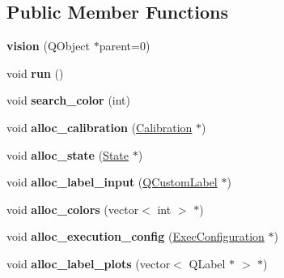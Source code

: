 \subsection*{Public Member Functions}
\begin{DoxyCompactItemize}
\item 
{\bfseries vision} (Q\+Object $\ast$parent=0)\hypertarget{classvision_a81ffb3d1b91453b4516bef1ac130b5c4}{}\label{classvision_a81ffb3d1b91453b4516bef1ac130b5c4}

\item 
void {\bfseries run} ()\hypertarget{classvision_ad213bf1ae76ed6a489390c501fe1b4e0}{}\label{classvision_ad213bf1ae76ed6a489390c501fe1b4e0}

\item 
void {\bfseries search\+\_\+color} (int)\hypertarget{classvision_a908d37e077c8844e2bfd5b38a1f65577}{}\label{classvision_a908d37e077c8844e2bfd5b38a1f65577}

\item 
void {\bfseries alloc\+\_\+calibration} (\hyperlink{structcommon_1_1Calibration}{Calibration} $\ast$)\hypertarget{classvision_a81fd57a35d8e331f844e1d276d8272f6}{}\label{classvision_a81fd57a35d8e331f844e1d276d8272f6}

\item 
void {\bfseries alloc\+\_\+state} (\hyperlink{structcommon_1_1State}{State} $\ast$)\hypertarget{classvision_a4f8eec2ffc63e3a2b3e76c347b13f537}{}\label{classvision_a4f8eec2ffc63e3a2b3e76c347b13f537}

\item 
void {\bfseries alloc\+\_\+label\+\_\+input} (\hyperlink{classQCustomLabel}{Q\+Custom\+Label} $\ast$)\hypertarget{classvision_a5951eb6e1bb8582b3f01dec96d3ad3ac}{}\label{classvision_a5951eb6e1bb8582b3f01dec96d3ad3ac}

\item 
void {\bfseries alloc\+\_\+colors} (vector$<$ int $>$ $\ast$)\hypertarget{classvision_a5d366b880029815afed304c1d2d29bfc}{}\label{classvision_a5d366b880029815afed304c1d2d29bfc}

\item 
void {\bfseries alloc\+\_\+execution\+\_\+config} (\hyperlink{structcommon_1_1ExecConfiguration}{Exec\+Configuration} $\ast$)\hypertarget{classvision_a3d623a2e736f204716f1d44bf496823f}{}\label{classvision_a3d623a2e736f204716f1d44bf496823f}

\item 
void {\bfseries alloc\+\_\+label\+\_\+plots} (vector$<$ Q\+Label $\ast$ $>$ $\ast$)\hypertarget{classvision_a75142dd50f6818ae2d954a1070b7e721}{}\label{classvision_a75142dd50f6818ae2d954a1070b7e721}


\end{DoxyCompactItemize}
